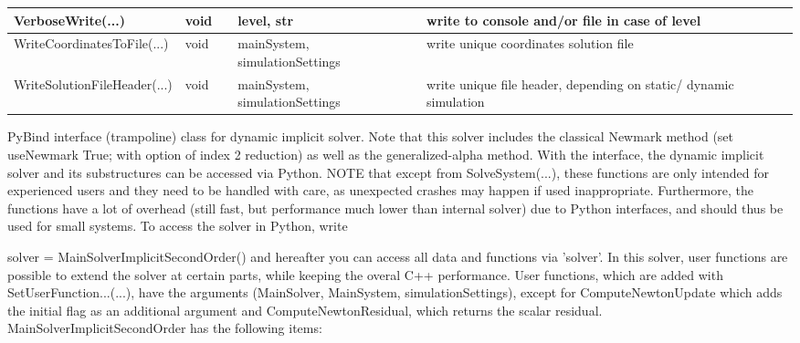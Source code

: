 \begin{center}
\begin{longtable}{| p{4.2cm} | p{2.5cm} | p{0.3cm} | p{3.0cm} | p{6cm} |}
    VerboseWrite(...) &     void &      &     level, str &     write to console and/or file in case of level\\ \hline
    WriteCoordinatesToFile(...) &     void &      &     mainSystem, simulationSettings &     write unique coordinates solution file\\ \hline
    WriteSolutionFileHeader(...) &     void &      &     mainSystem, simulationSettings &     write unique file header, depending on static/ dynamic simulation\\ \hline
	  \end{longtable}
	\end{center}

 \label{sec:MainSolverImplicitSecondOrder}
PyBind interface (trampoline) class for dynamic implicit solver. Note that this solver includes the classical Newmark method (set useNewmark True; with option of index 2 reduction) as well as the generalized-alpha method. With the interface, the dynamic implicit solver and its substructures can be accessed via Python. NOTE that except from SolveSystem(...), these functions are only intended for experienced users and they need to be handled with care, as unexpected crashes may happen if used inappropriate. Furthermore, the functions have a lot of overhead (still fast, but performance much lower than internal solver) due to Python interfaces, and should thus be used for small systems. To access the solver in Python, write \bi
 \item[] solver = MainSolverImplicitSecondOrder() 
\ei
 and hereafter you can access all data and functions via 'solver'.
 In this solver, user functions are possible to extend the solver at certain parts, while keeping the overal C++ performance. User functions, which are added with SetUserFunction...(...), have the arguments (MainSolver, MainSystem, simulationSettings), except for ComputeNewtonUpdate which adds the initial flag as an additional argument and ComputeNewtonResidual, which returns the scalar residual.\\ 
%
MainSolverImplicitSecondOrder has the following items:
